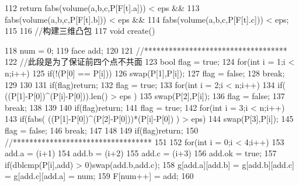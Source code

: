 \documentclass[11pt]{article}
\begin{document}
\begin{Code}
{{112              return fabs(volume(a,b,c,P[F[t].a])) < eps &&
113                  fabs(volume(a,b,c,P[F[t].b])) < eps &&
114                  fabs(volume(a,b,c,P[F[t].c])) < eps;
115       }
116       //构建三维凸包
117       void create(){
118           num = 0;
119           face add;
120
121              //***********************************
122              //此段是为了保证前四个点不共面
123              bool flag = true;
124              for(int i = 1;i < n;i++){
125                  if(!(P[0] == P[i])){
126                       swap(P[1],P[i]);
127                       flag = false;
128                       break;
129                  }
130              }
131              if(flag)return;
132              flag = true;
133              for(int i = 2;i < n;i++){
134                  if( ((P[1]-P[0])^(P[i]-P[0])).len() > eps ){
135                       swap(P[2],P[i]);
136                       flag = false;
137                       break;
138                  }
139              }
140              if(flag)return;
141              flag = true;
142              for(int i = 3;i < n;i++){
143                  if(fabs( ((P[1]-P[0])^(P[2]-P[0]))*(P[i]-P[0]) ) > eps)
                        {
144                       swap(P[3],P[i]);
145                       flag = false;
146                       break;
147                  }
148              }
149              if(flag)return;
150              //**********************************
151
152              for(int i = 0;i < 4;i++){
153                  add.a = (i+1)%
154                  add.b = (i+2)%
155                  add.c = (i+3)%
156                  add.ok = true;
157                  if(dblcmp(P[i],add) > 0)swap(add.b,add.c);
158                  g[add.a][add.b] = g[add.b][add.c] = g[add.c][add.a] =
                        num;
159                  F[num++] = add;
160              }


}}
\end{Code}
\end{document}
